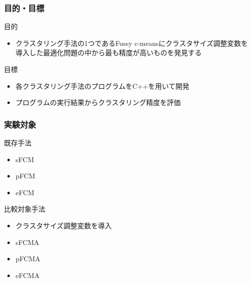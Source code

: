 \documentclass[13pt,dvipdfmx]{beamer}
\begin{document}
\begin{frame}\frametitle{目的・目標}
\begin{block}{目的}
\begin{itemize}
 \item クラスタリング手法の1つであるFussy c-meansにクラスタサイズ調整変数を導入した最適化問題の中から最も精度が高いものを発見する
\end{itemize}
\end{block}
\vspace{4mm}
\begin{block}{目標}
\begin{itemize}
 \item 各クラスタリング手法のプログラムをC++を用いて開発
 \item プログラムの実行結果からクラスタリング精度を評価
\end{itemize}
\end{block}
\end{frame}

\begin{frame}\frametitle{実験対象}
  \begin{block}{既存手法}
   \begin{itemize}
    \item sFCM
    \item pFCM
    \item eFCM
   \end{itemize}
  \end{block}
 \begin{block}{比較対象手法}
   \begin{itemize}
    \item クラスタサイズ調整変数を導入
    \item sFCMA
    \item pFCMA
    \item eFCMA
   \end{itemize}
 \end{block}
\end{frame}
\end{document}

